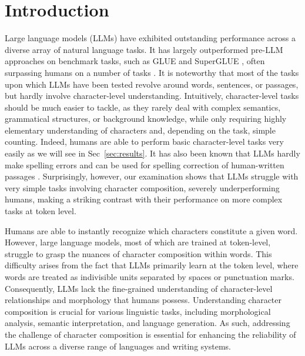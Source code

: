 \documentclass{article}
\theoremstyle{plain}
\theoremstyle{definition}
\theoremstyle{remark}
\begin{document}
\begin{abstract}
Large language models (LLMs) have demonstrated remarkable performances on a wide range of natural language tasks. Yet, LLMs' successes have been largely restricted to tasks concerning words, sentences, or documents, and it remains questionable how much they understand the minimal units of text, namely characters. In this paper, we examine contemporary LLMs regarding their ability to understand character composition of words, and show that most of them fail to reliably carry out even the simple tasks that can be handled by humans with perfection. We analyze their behaviors with comparison to token level performances, and discuss the potential directions for future research.
\end{abstract}

\section{Introduction}
\label{intro}
Large language models (LLMs) \cite{Achiam2023GPT4TR,Chowdhery2022PaLMSL,Touvron2023Llama2O,Reid2024Gemini1U,OpenAI2022,Jiang2023Mistral7} have exhibited outstanding performance across a diverse array of natural language tasks. It has largely outperformed pre-LLM approaches on benchmark tasks, such as GLUE \cite{Wang2018GLUEAM} and SuperGLUE \cite{Wang2019SuperGLUEAS}, often surpassing humans on a number of tasks \cite{Chowdhery2022PaLMSL}. It is noteworthy that most of the tasks upon which LLMs have been tested revolve around words, sentences, or passages, but hardly involve character-level understanding. Intuitively, character-level tasks should be much easier to tackle, as they rarely deal with complex semantics, grammatical structures, or background knowledge, while only requiring highly elementary understanding of characters and, depending on the task, simple counting. Indeed, humans are able to perform basic character-level tasks very easily as we will see in Sec~\ref{sec:results}. It has also been known that LLMs hardly make spelling errors and can be used for spelling correction of human-written passages \cite{Whittaker2024LargeLM}. Surprisingly, however, our examination shows that LLMs struggle with very simple tasks involving character composition, severely underperforming humans, making a striking contrast with their performance on more complex tasks at token level.


Humans are able to instantly recognize which characters constitute a given word. However, large language models, most of which are trained at token-level, struggle to grasp the nuances of character composition within words. This difficulty arises from the fact that LLMs primarily learn at the token level, where words are treated as indivisible units separated by spaces or punctuation marks. Consequently, LLMs lack the fine-grained understanding of character-level relationships and morphology that humans possess. Understanding character composition is crucial for various linguistic tasks, including morphological analysis, semantic interpretation, and language generation. As such, addressing the challenge of character composition is essential for enhancing the reliability of LLMs across a diverse range of languages and writing systems.
\end{document}
